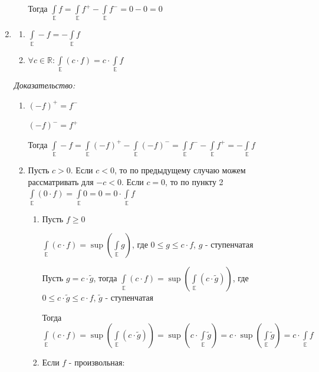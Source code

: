 \documentclass[paper=a4, fontsize=17pt]{article}
\begin{document}
\begin{enumerate}
\begin{enumerate}
		Тогда $\int\limits_\mathds{E} f = \int\limits_{\mathds{E}} f^+ - \int\limits_{\mathds{E}} f^- = 0 - 0 = 0$
	\end{enumerate}

	\item
	\begin{enumerate}
		\item
		$\int\limits_{\mathds{E}} -f = - \int\limits_{\mathds{E}} f$

		\item
		$\forall c \in \mathds{R}: \int\limits_{\mathds{E}} (c \cdot f) = c \cdot \int\limits_{\mathds{E}} f $
	\end{enumerate}

	\emph{Доказательство:}
	\begin{enumerate}
		\item
		$(-f)^+ = f^-$

		$(-f)^- = f^+$

		Тогда $\int\limits_{\mathds{E}} -f = \int\limits_{\mathds{E}} (-f)^+ - \int\limits_{\mathds{E}} (-f)^- = \int\limits_{\mathds{E}} f^- - \int\limits_{\mathds{E}} f^+ = -\int\limits_{\mathds{E}} f$

		\item

		Пусть $c > 0$. Если $c < 0$, то по предыдущему случаю можем рассматривать для $- c < 0$. Если $c = 0$, то по пункту 2 $\int\limits_{\mathds{E}} (0 \cdot f) = \int\limits_{\mathds{E}} 0 = 0 = 0 \cdot \int\limits_{\mathds{E}} f$

		\begin{enumerate}
			\item
			Пусть $f \geqslant 0$

			$\int\limits_{\mathds{E}} (c \cdot f) = \sup (\int\limits_{\mathds{E}} g)$, где $0 \leqslant g \leqslant c \cdot f$, $g$ - ступенчатая

			Пусть $g = c \cdot \widetilde{g}$, тогда $\int\limits_{\mathds{E}} (c \cdot f) = \sup (\int\limits_{\mathds{E}} (c \cdot \widetilde{g}))$, где $0 \leqslant c \cdot \widetilde{g} \leqslant c \cdot f$, $\widetilde{g}$ - ступенчатая

			Тогда $\int\limits_{\mathds{E}} (c \cdot f) = \sup (\int\limits_{\mathds{E}} (c \cdot \widetilde{g})) = \sup (c \cdot \int\limits_{\mathds{E}} \widetilde{g}) = c \cdot \sup (\int\limits_{\mathds{E}} \widetilde{g}) = c \cdot \int\limits_{\mathds{E}} f $

			\item Если $f$ - произвольная:


\end{enumerate}
\end{enumerate}
\end{enumerate}
\end{document}
